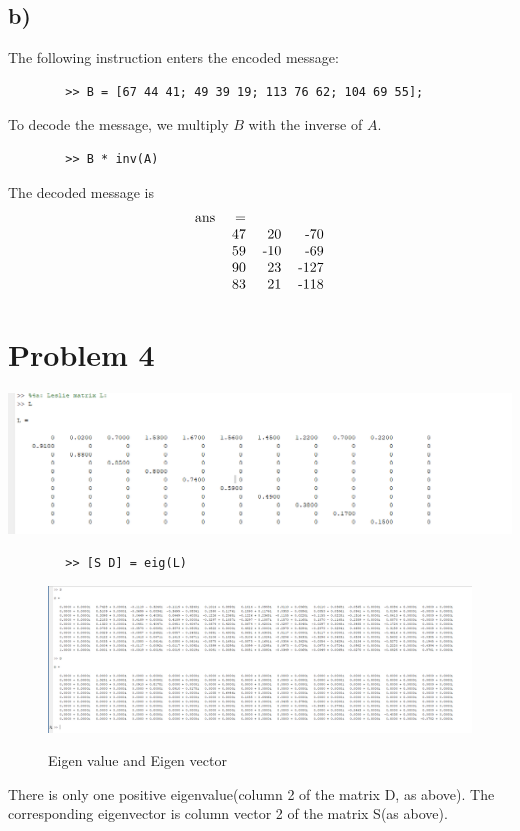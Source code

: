 \documentclass[12pt,en,a4paper]{article}
\begin{document}
	\subsection*{b)}
	The following instruction enters the encoded message:
	\begin{mdframed}[hidealllines=true,backgroundcolor=magenta!10]
		\begin{lstlisting}
		>> B = [67 44 41; 49 39 19; 113 76 62; 104 69 55];
		\end{lstlisting}
	\end{mdframed}
	To decode the message, we multiply $B$ with the inverse of $A$.
	\begin{mdframed}[hidealllines=true,backgroundcolor=magenta!10]
		\begin{lstlisting}
		>> B * inv(A)
		\end{lstlisting}
	\end{mdframed}
	The decoded message is \\
	\[
	\begin{tabular}{l r r r}
	ans & = & & \\
	& 47 & 20 & -70 \\
	& 59 & -10 & -69 \\
	& 90 & 23 & -127 \\
	& 83 & 21 & -118
	\end{tabular}
	\]
	\newpage
	\section*{Problem 4}
	\includegraphics[scale = .7]{prob4aLeslie.png}
	\begin{mdframed}[hidealllines=true,backgroundcolor=magenta!10]
		\begin{lstlisting}
		>> [S D] = eig(L)
		\end{lstlisting}
	\end{mdframed}
	\begin{figure}[H]
		\centering
		\includegraphics[scale = .4]{prob4aEigen.png}
		\label{prob4aE}
		\caption*{Eigen value and Eigen vector}
	\end{figure}
	There is only one positive eigenvalue(column 2 of the matrix D, as above). The corresponding eigenvector is column vector 2 of the matrix S(as above).\\
\end{document}
